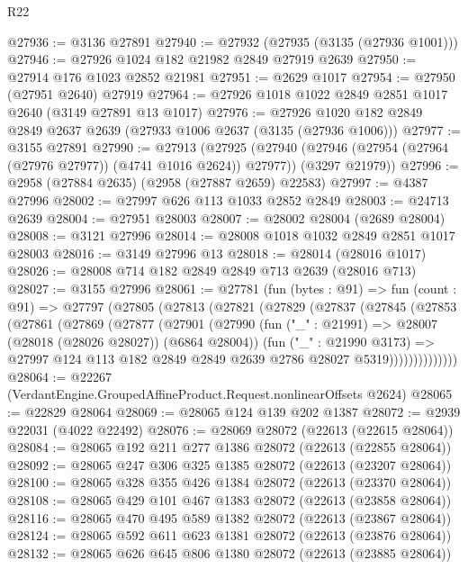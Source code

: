 \begin{lexlean}{R22}
\begin{coremodule}
@27936 := @3136 @27891
@27940 := @27932 (@27935 (@3135 (@27936 @1001)))
@27946 := @27926 @1024 @182 @21982 @2849 @27919 @2639
@27950 := @27914 @176 @1023 @2852 @21981
@27951 := @2629 @1017
@27954 := @27950 (@27951 @2640) @27919
@27964 := @27926 @1018 @1022 @2849 @2851 @1017 @2640 (@3149 @27891 @13 @1017)
@27976 := @27926 @1020 @182 @2849 @2849 @2637 @2639 (@27933 @1006 @2637 (@3135 (@27936 @1006)))
@27977 := @3155 @27891
@27990 := @27913
    (@27925
      (@27940 (@27946 (@27954 (@27964 (@27976 @27977)) (@4741 @1016 @2624)) @27977))
      (@3297 @21979))
@27996 := @2958 (@27884 @2635) (@2958 (@27887 @2659) @22583)
@27997 := @4387 @27996
@28002 := @27997 @626 @113 @1033 @2852 @2849
@28003 := @24713 @2639
@28004 := @27951 @28003
@28007 := @28002 @28004 (@2689 @28004)
@28008 := @3121 @27996
@28014 := @28008 @1018 @1032 @2849 @2851 @1017 @28003
@28016 := @3149 @27996 @13
@28018 := @28014 (@28016 @1017)
@28026 := @28008 @714 @182 @2849 @2849 @713 @2639 (@28016 @713)
@28027 := @3155 @27996
@28061 := @27781
    (fun (bytes : @91) =>
    fun (count : @91) =>
    @27797
      (@27805
        (@27813
          (@27821
            (@27829
              (@27837
                (@27845
                  (@27853
                    (@27861
                      (@27869
                        (@27877
                          (@27901
                            (@27990
                              (fun ("_" : @21991) => @28007 (@28018 (@28026 @28027)) (@6864 @28004))
                              (fun ("_" : @21990 @3173) =>
                              @27997
                                @124
                                @113
                                @182
                                @2849
                                @2849
                                @2639
                                @2786
                                @28027
                                @5319))))))))))))))
@28064 := @22267 (VerdantEngine.GroupedAffineProduct.Request.nonlinearOffsets @2624)
@28065 := @22829 @28064
@28069 := @28065 @124 @139 @202 @1387
@28072 := @2939 @22031 (@4022 @22492)
@28076 := @28069 @28072 (@22613 (@22615 @28064))
@28084 := @28065 @192 @211 @277 @1386 @28072 (@22613 (@22855 @28064))
@28092 := @28065 @247 @306 @325 @1385 @28072 (@22613 (@23207 @28064))
@28100 := @28065 @328 @355 @426 @1384 @28072 (@22613 (@23370 @28064))
@28108 := @28065 @429 @101 @467 @1383 @28072 (@22613 (@23858 @28064))
@28116 := @28065 @470 @495 @589 @1382 @28072 (@22613 (@23867 @28064))
@28124 := @28065 @592 @611 @623 @1381 @28072 (@22613 (@23876 @28064))
@28132 := @28065 @626 @645 @806 @1380 @28072 (@22613 (@23885 @28064))

\end{coremodule}
\end{lexlean}
